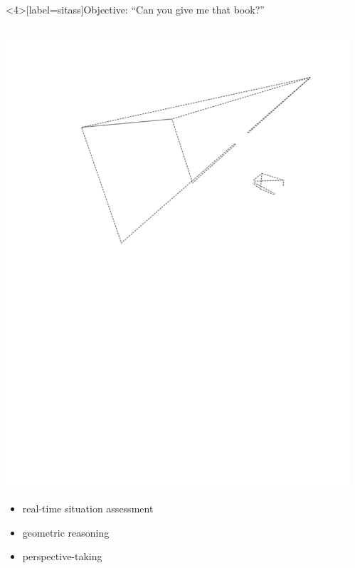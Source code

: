 \documentclass[xcolor=table]{beamer}
\begin{document}
\begin{frame}<4>[label=sitass]{Objective: ``Can you give me that book?''}

    \begin{columns}
        \begin{column}{0.3\linewidth}
            \centering
            \includegraphics[width=\linewidth]{situation-assessment}

            {\tiny
            \begin{itemize}
                \item real-time situation assessment
                \item geometric reasoning
                \item perspective-taking
            \end{itemize}
            }

        \end{column}
        \begin{column}{0.4\linewidth}


\end{column}
\end{columns}
\end{frame}
\end{document}
